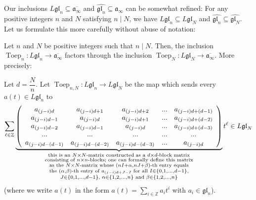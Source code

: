 \documentclass[etingof-lie.tex]{subfiles}
\begin{document}
Our inclusions $L\mathfrak{gl}_{n}\subseteq\overline{\mathfrak{a}_{\infty}}$
and $\widehat{\mathfrak{gl}_{n}}\subseteq\mathfrak{a}_{\infty}$ can be
somewhat refined: For any positive integers $n$ and $N$ satisfying $n\mid N$,
we have $L\mathfrak{gl}_{n}\subseteq L\mathfrak{gl}_{N}$ and
$\widehat{\mathfrak{gl}_{n}}\subseteq\widehat{\mathfrak{gl}_{N}}$. Let us
formulate this more carefully without abuse of notation:

\begin{proposition}
\label{prop.glnhat.div}Let $n$ and $N$ be positive integers such that $n\mid
N$. Then, the inclusion $\operatorname*{Toep}\nolimits_{n}:L\mathfrak{gl}%
_{n}\rightarrow\overline{\mathfrak{a}_{\infty}}$ factors through the inclusion
$\operatorname*{Toep}\nolimits_{N}:L\mathfrak{gl}_{N}\rightarrow
\overline{\mathfrak{a}_{\infty}}$. More precisely:

Let $d=\dfrac{N}{n}$. Let $\operatorname*{Toep}\nolimits_{n,N}:L\mathfrak{gl}%
_{n}\rightarrow L\mathfrak{gl}_{N}$ be the map which sends every $a\left(
t\right)  \in L\mathfrak{gl}_{n}$ to%
\[
\sum\limits_{\ell\in\mathbb{Z}}\underbrace{\left(
\begin{array}
[c]{ccccc}%
a_{\left(  j-i\right)  d} & a_{\left(  j-i\right)  d+1} & a_{\left(
j-i\right)  d+2} & ... & a_{\left(  j-i\right)  d+\left(  d-1\right)  }\\
a_{\left(  j-i\right)  d-1} & a_{\left(  j-i\right)  d} & a_{\left(
j-i\right)  d+1} & ... & a_{\left(  j-i\right)  d+\left(  d-2\right)  }\\
a_{\left(  j-i\right)  d-2} & a_{\left(  j-i\right)  d-1} & a_{\left(
j-i\right)  d} & ... & a_{\left(  j-i\right)  d+\left(  d-3\right)  }\\
... & ... & ... & ... & ...\\
a_{\left(  j-i\right)  d-\left(  d-1\right)  } & a_{\left(  j-i\right)
d-\left(  d-2\right)  } & a_{\left(  j-i\right)  d-\left(  d-3\right)  } &
... & a_{\left(  j-i\right)  d}%
\end{array}
\right)  }_{\substack{\text{this is an }N\times N\text{-matrix constructed as
a }d\times d\text{-block matrix}\\\text{consisting of }n\times n\text{-blocks;
one can formally define this matrix}\\\text{as the }N\times N\text{-matrix
whose }\left(  nI+\alpha,nJ+\beta\right)  \text{-th entry equals}\\\text{the
}\left(  \alpha,\beta\right)  \text{-th entry of }a_{\left(  j-i\right)
d+J-I}\text{ for all }I\in\left\{  0,1,...,d-1\right\}  \text{,}\\J\in\left\{
0,1,...,d-1\right\}  \text{, }\alpha\in\left\{  1,2,...,n\right\}  \text{ and
}\beta\in\left\{  1,2,...,n\right\}  }}t^{\ell}\in L\mathfrak{gl}_{N}%
\]
(where we write $a\left(  t\right)  $ in the form $a\left(  t\right)
=\sum\limits_{i\in\mathbb{Z}}a_{i}t^{i}$ with $a_{i}\in\mathfrak{gl}_{n}$).


\end{proposition}
\end{document}
